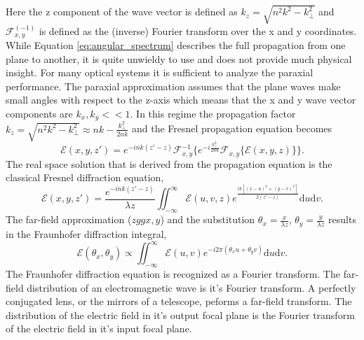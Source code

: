 \documentclass[letterpaper]{ar-1col}
\begin{document}
Here the z component of the wave vector is defined as $k_z=\sqrt{n^2k^2 - k_{\perp}^2}$ and $\mathcal{F}_{x,y}^{(-1)}$ is defined as the (inverse) Fourier transform over the x and y coordinates.
%
While Equation \ref{eq:angular_spectrum} describes the full propagation from one plane to another, it is quite unwieldy to use and does not provide much physical insight.
%
For many optical systems it is sufficient to analyze the paraxial performance.
%
The paraxial approximation assumes that the plane waves make small angles with respect to the z-axis which means that the x and y wave vector components are $k_x,k_y<<1$.
%
In this regime the propagation factor $k_z=\sqrt{n^2k^2 - k_{\perp}^2}\approx nk - \frac{k_{\perp}^2}{2nk}$ and the Fresnel propagation equation becomes
\begin{equation}
\label{eq:angular_spectrum2}
\mathcal{E}(x, y, z') = e^{-ink(z'-z)} \mathcal{F}_{x,y}^{-1}\{ e^{-i\frac{k_{\perp}^2}{2nk}} \mathcal{F}_{x,y}\{\mathcal{E}(x,y,z)\}\}.
\end{equation}
The real space solution that is derived from the propagation equation is the classical Fresnel diffraction equation,
\begin{equation}
\label{eq:fresnel_diffraction}
\mathcal{E}(x, y, z') = \frac{e^{-ink(z'-z)}}{\lambda z} \iint_{-\infty}^{\infty} \mathcal{E}(u, v, z) e^{\frac{ik\left[(x - u)^2 + (y - v)^2\right]}{2 (z' - z)}} \mathrm{d}u \mathrm{d}v.
\end{equation}
The far-field approximation ($z gg x, y$) and the substitution $\theta_x = \frac{x}{\lambda z}$, $\theta_y = \frac{y}{\lambda z}$ results in the Fraunhofer diffraction integral,
\begin{equation}
\label{eq:fraunhofer_diffraction}
\mathcal{E}(\theta_x, 
\theta_y) \propto \iint_{-\infty}^{\infty} \mathcal{E}(u, v) e^{-i2\pi(\theta_x u + \theta_y v)} \mathrm{d}u \mathrm{d}v.
\end{equation}
The Fraunhofer diffraction equation is recognized as a Fourier transform. The far-field distribution of an electromagnetic wave is it's Fourier transform. A perfectly conjugated lens, or the mirrors of a telescope, peforms a far-field transform. The distribution of the electric field in it's output focal plane is the Fourier transform of the electric field in it's input focal plane.

\end{document}

